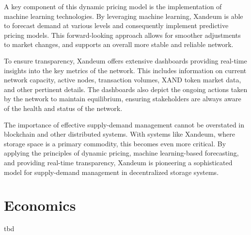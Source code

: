 \documentclass[11pt]{article}   	%
\let\oldsection\section
\renewcommand{\section}{\clearpage\oldsection}
\begin{document}
A key component of this dynamic pricing model is the implementation of machine learning technologies. By leveraging machine learning, Xandeum is able to forecast demand at various levels and consequently implement predictive pricing models. This forward-looking approach allows for smoother adjustments to market changes, and supports an overall more stable and reliable network.

To ensure transparency, Xandeum offers extensive dashboards providing real-time insights into the key metrics of the network. This includes information on current network capacity, active nodes, transaction volumes, XAND token market data, and other pertinent details. The dashboards also depict the ongoing actions taken by the network to maintain equilibrium, ensuring stakeholders are always aware of the health and status of the network.

The importance of effective supply-demand management cannot be overstated in blockchain and other distributed systems. With systems like Xandeum, where storage space is a primary commodity, this becomes even more critical. By applying the principles of dynamic pricing, machine learning-based forecasting, and providing real-time transparency, Xandeum is pioneering a sophisticated model for supply-demand management in decentralized storage systems.

\section{Economics}
tbd
\end{document}
